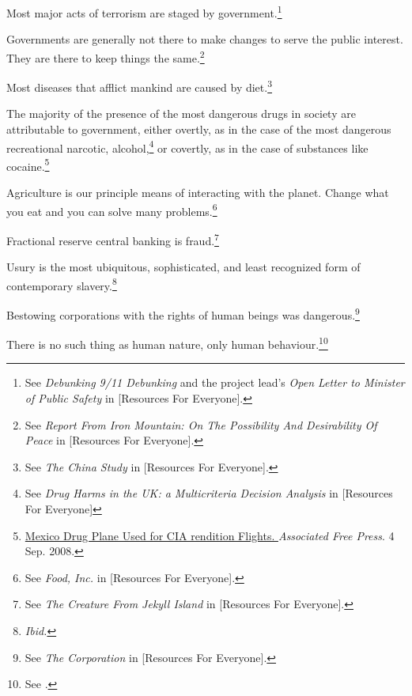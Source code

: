 \item
Most major acts of terrorism are staged by government.\footnote{See {\it Debunking 9/11 Debunking} and the project lead's {\it Open Letter to Minister of Public Safety} in [Resources For Everyone].}

\item
Governments are generally not there to make changes to serve the public interest. They are there to keep things the same.\footnote{See {\it Report From Iron Mountain: On The Possibility And Desirability Of Peace} in [Resources For Everyone].}

\item
Most diseases that afflict mankind are caused by diet.\footnote{See {\it The China Study} in [Resources For Everyone].}

\item
The majority of the presence of the most dangerous drugs in society are attributable to government, either overtly, as in the case of the most dangerous recreational narcotic, alcohol,\footnote{See {\it Drug Harms in the UK: a Multicriteria Decision Analysis} in [Resources For Everyone]} or covertly, as in the case of substances like cocaine.\footnote{\href{http://afp.google.com/article/ALeqM5j6QonBKKMo2gw1e3ql-xUcQEZbVg}{Mexico Drug Plane Used for CIA rendition Flights. }{\it Associated Free Press}. 4 Sep. 2008.}

\item
Agriculture is our principle means of interacting with the planet. Change what you eat and you can solve many problems.\footnote{See {\it Food, Inc.} in [Resources For Everyone].}

\item
Fractional reserve central banking is fraud.\footnote{See {\it The Creature From Jekyll Island} in [Resources For Everyone].}

\item
Usury is the most ubiquitous, sophisticated, and least recognized form of contemporary slavery.\footnote{{\it Ibid.}}

\item
Bestowing corporations with the rights of human beings was dangerous.\footnote{See {\it The Corporation} in [Resources For Everyone].}

\item
There is no such thing as human nature, only human behaviour.\footnote{See .}

